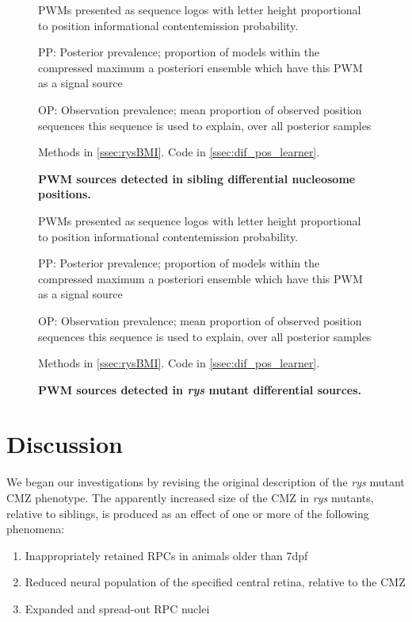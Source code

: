\begin{figure}[!h]
    \caption{{\bf PWM sources detected in sibling differential nucleosome positions.}}
    PWMs presented as sequence logos with letter height proportional to position informational content\/emission probability.
    
    PP: Posterior prevalence; proportion of models within the compressed maximum a posteriori ensemble which have this PWM as a signal source

    OP: Observation prevalence; mean proportion of observed position sequences this sequence is used to explain, over all posterior samples

    Methods in \autoref{ssec:rysBMI}.
    Code in \autoref{ssec:dif_pos_learner}.
    \label{sibmotifs}
\end{figure}

\begin{figure}[!h]
    \caption{{\bf PWM sources detected in \textit{rys} mutant differential sources.}}
    PWMs presented as sequence logos with letter height proportional to position informational content\/emission probability.
    
    PP: Posterior prevalence; proportion of models within the compressed maximum a posteriori ensemble which have this PWM as a signal source

    OP: Observation prevalence; mean proportion of observed position sequences this sequence is used to explain, over all posterior samples
    
    Methods in \autoref{ssec:rysBMI}.
    Code in \autoref{ssec:dif_pos_learner}.
    \label{rysmotifs}
\end{figure}

\FloatBarrier

\section{Discussion}
We began our investigations by revising the original description of the \textit{rys} mutant CMZ phenotype. The apparently increased size of the CMZ in \textit{rys} mutants, relative to siblings, is produced as an effect of one or more of the following phenomena:

\begin{enumerate}
\item\label{inapret} Inappropriately retained RPCs in animals older than 7dpf
\item\label{specfail} Reduced neural population of the specified central retina, relative to the CMZ
\item\label{chromo} Expanded and spread-out RPC nuclei
\end{enumerate}

